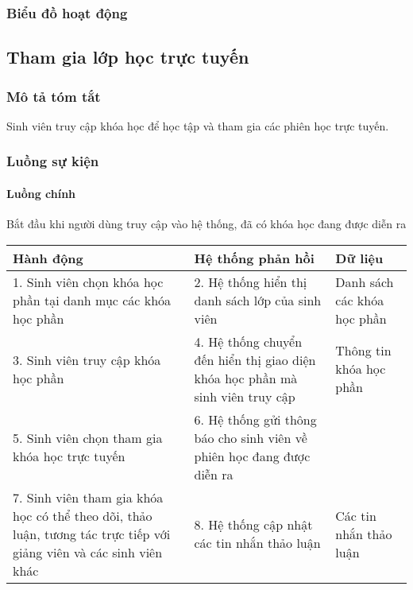 \documentclass[./../main_file.tex]{subfiles}
\begin{document}
\subsubsection{Biểu đồ hoạt động}

\subsection{Tham gia lớp học trực tuyến}
\subsubsection{Mô tả tóm tắt}
Sinh viên truy cập khóa học để học tập và tham gia các phiên học trực tuyến.

\subsubsection{Luồng sự kiện}
\paragraph{Luồng chính}
Bắt đầu khi người dùng truy cập vào hệ thống, đã có khóa học đang được diễn ra
\begin{longtable}{|p{}|p{}|p{}|}
		\hline
		\textbf{Hành động}                                           & \textbf{Hệ thống phản hồi}                                                   & \textbf{Dữ liệu}           \\ \hline
		1. Sinh viên chọn khóa học phần tại danh mục các khóa học phần & 2. Hệ thống hiển thị danh sách lớp của sinh viên                             & Danh sách các khóa học phần \\ \hline
		3. Sinh viên truy cập khóa học phần                           & 4. Hệ thống chuyển đến hiển thị giao diện khóa học phần mà sinh viên truy cập & Thông tin khóa học phần     \\ \hline
		5. Sinh viên chọn tham gia khóa học trực tuyến                & 6. Hệ thống gửi thông báo cho sinh viên về phiên học đang được diễn ra       &                            \\ \hline
		7. Sinh viên tham gia khóa học có thể theo dõi, thảo luận, tương tác trực tiếp với giảng viên và các sinh viên khác &
		8. Hệ thống cập nhật các tin nhắn thảo luận &
		Các tin nhắn thảo luận \\ \hline
\end{longtable}
\end{document}
